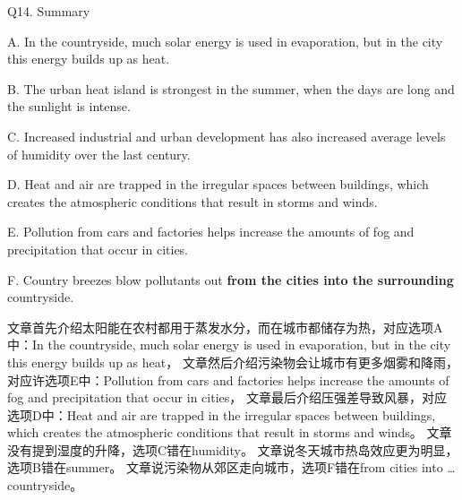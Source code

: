 \begin{blk}
    \begin{qst}
        Q14. Summary
    \end{qst}

    \begin{chc}
        A. In the countryside, much solar energy is used in evaporation, but in the city this energy builds up as heat.

        B. The urban heat island is strongest in the summer, when the days are long and the sunlight is intense.

        C. Increased industrial and urban development has also increased average levels of humidity over the last century.

        D. Heat and air are trapped in the irregular spaces between buildings, which creates the atmospheric conditions that result in storms and winds.

        E. Pollution from cars and factories helps increase the amounts of fog and precipitation that occur in cities.

        F. Country breezes blow pollutants out \textbf{from the cities into the surrounding} countryside.
    \end{chc}

    \begin{nlz}
        文章首先介绍太阳能在农村都用于蒸发水分，而在城市都储存为热，对应选项A中：In the countryside, much solar energy is used in evaporation, but in the city this energy builds up as heat，
        文章然后介绍污染物会让城市有更多烟雾和降雨，对应许选项E中：Pollution from cars and factories helps increase the amounts of fog and precipitation that occur in cities，
        文章最后介绍压强差导致风暴，对应选项D中：Heat and air are trapped in the irregular spaces between buildings, which creates the atmospheric conditions that result in storms and winds。
        文章没有提到湿度的升降，选项C错在humidity。
        文章说冬天城市热岛效应更为明显，选项B错在summer。
        文章说污染物从郊区走向城市，选项F错在from cities into … countryside。
    \end{nlz}
\end{blk}
